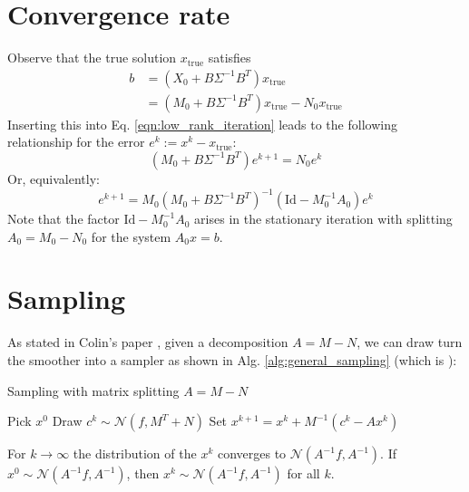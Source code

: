 \documentclass[11pt]{article}
\newcommand{\xtrue}{x_{\text{true}}}
\begin{document}
\section{Convergence rate}
Observe that the true solution $\xtrue$ satisfies
\begin{equation}
    \begin{aligned}
        b & = (X_0 + B\Sigma^{-1}B^T)\xtrue               \\
          & = (M_0 + B\Sigma^{-1}B^T) \xtrue - N_0 \xtrue
    \end{aligned}
\end{equation}
Inserting this into Eq. \eqref{eqn:low_rank_iteration} leads to the following relationship for the error $e^k:= x^k-\xtrue$:
\begin{equation}
    (M_0 + B\Sigma^{-1}B^T)e^{k+1} = N_0 e^k
\end{equation}
Or, equivalently:
\begin{equation}
    e^{k+1} = M_0\left(M_0 + B\Sigma^{-1}B^T\right)^{-1} \left(\text{Id}-M_0^{-1}A_0\right) e^k
\end{equation}
Note that the factor $\text{Id} - M_0^{-1}A_0$ arises in the stationary iteration with splitting $A_0=M_0-N_0$ for the system $A_0x=b$.
\section{Sampling}
As stated in Colin's paper \cite{Fox2017}, given a decomposition $A=M-N$, we can draw turn the smoother into a sampler as shown in Alg. \ref{alg:general_sampling} (which is \cite[Algorithm 5]{Fox2017}):
\begin{algorithm}
    \caption{Sampling with matrix splitting $A=M-N$}\label{alg:general_sampling}
    \begin{algorithmic}[1]
        \State Pick $x^0$
        \State Draw $c^k\sim\mathcal{N}(f,M^T+N)$
        \State Set $x^{k+1} = x^{k} + M^{-1}\left(c^k - Ax^k \right)$
        \EndFor
    \end{algorithmic}
\end{algorithm}
For $k\rightarrow \infty$ the distribution of the $x^k$ converges to $\mathcal{N}(A^{-1}f,A^{-1})$. If $x^0\sim\mathcal{N}(A^{-1}f,A^{-1})$, then $x^k\sim \mathcal{N}(A^{-1}f,A^{-1})$ for all $k$.
\end{document}
